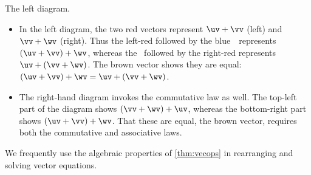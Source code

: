 \begin{example}
\begin{center}
\end{center}
\begin{solution} 
The left diagram.
\begin{itemize}
\item In the left diagram, the two red vectors represent \(\uv+\vv\) (left) and \(\vv+\wv\) (right).
Thus the left-red followed by the blue~\wv\ represents \((\uv+\vv)+\wv\), whereas the \uv\ followed by the right-red represents \(\uv+(\vv+\wv)\).
The brown vector shows they are equal: \((\uv+\vv)+\wv=\uv+(\vv+\wv)\).

\item The right-hand diagram invokes the commutative law as well.
The top-left part of the diagram shows \((\vv+\wv)+\uv\), whereas the bottom-right part shows \((\uv+\vv)+\wv\).
That these are equal, the brown vector, requires both the commutative and associative laws.
\end{itemize}
\end{solution}
\end{example}


We frequently use the algebraic properties of \autoref{thm:vecops} in rearranging and solving vector equations. 

